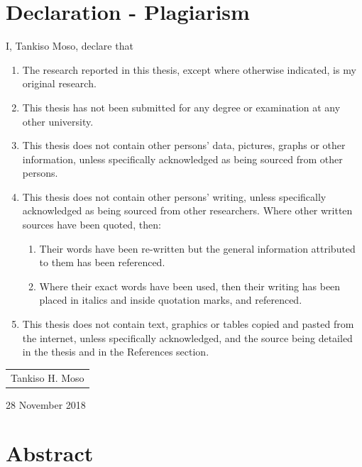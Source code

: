 \documentclass[12pt,a4paper]{report}
\begin{document}
\section*{Declaration - Plagiarism}


I, Tankiso Moso, declare that\\

\begin{enumerate}
	\item The research reported in this thesis, except where otherwise indicated, is my original research.
	\item This thesis has not been submitted for any degree or examination at any other university.
	\item This thesis does not contain other persons’ data, pictures, graphs or other information, unless specifically acknowledged as being sourced from other persons.
	\item This thesis does not contain other persons' writing, unless specifically acknowledged as being sourced from other researchers.  Where other written sources have been quoted, then:
\begin{enumerate}
	\item Their words have been re-written but the general information attributed to them has been referenced.
	\item Where their exact words have been used, then their writing has been placed in italics and inside quotation marks, and referenced.
\end{enumerate}
		
	\item This thesis does not contain text, graphics or tables copied and pasted from the internet, unless specifically acknowledged, and the source being detailed in the thesis and in the References section.
\end{enumerate}
\vspace{0.5cm}
	
\begin{table}[h]
\begin{tabular}{c}
\hline
Tankiso H. Moso\\
\end{tabular}
\end{table}	
28 November 2018 %
					
\newpage
\section*{Abstract}
\end{document}
